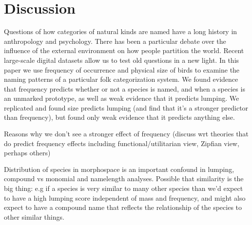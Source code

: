 \documentclass[10pt,letterpaper]{article}
\begin{document}







\section{Discussion}


Questions of how categories of natural kinds are named have a long history in anthropology and psychology. There has been a particular debate over the influence of the external environment on how people partition the world. Recent large-scale digital datasets allow us to test old questions in a new light. In this paper we use frequency of occurrence and physical size of birds to examine the naming patterns of a particular folk categorization system. We found evidence that frequency predicts whether or not a species is named, and when a species is an unmarked prototype, as well as weak evidence that it predicts lumping. We replicated  and found size predicts lumping (and find that it's a stronger predictor than frequency), but found only weak evidence that it predicts anything else.

Reasons why we don’t see a stronger effect of frequency (discuss wrt theories that do predict frequency effects including functional/utilitarian view, Zipfian view, perhaps others)

Distribution of species in morphospace is an important confound in lumping, compound vs monomial and namelength analyses. Possible that similarity is the big thing: e.g if a species is very similar to many other species than we’d expect to have a high lumping score independent of mass and frequency, and might also expect to have a compound name that reflects the relationship of the species to other similar things.
\end{document}
